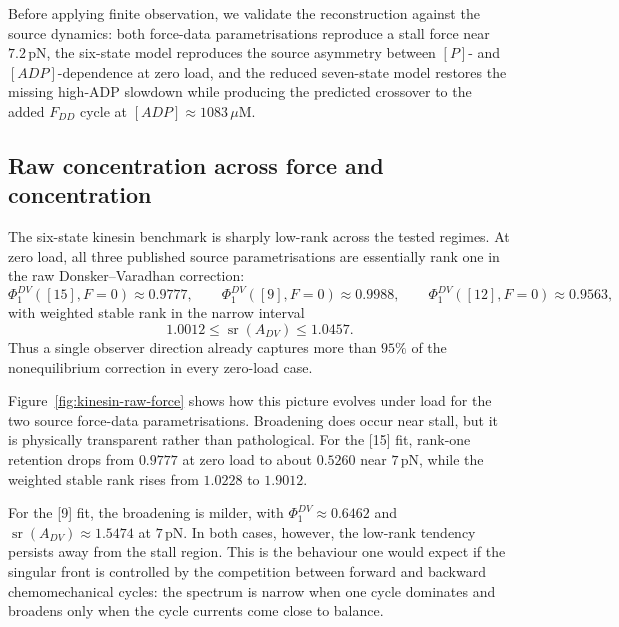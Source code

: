 \documentclass[11pt,a4paper]{article}
\numberwithin{equation}{section}
\theoremstyle{thmcompact}
\theoremstyle{remark}
\begin{document}
Before applying finite observation, we validate the reconstruction against the source dynamics: both force-data parametrisations reproduce a stall force near \(7.2\,\mathrm{pN}\), the six-state model reproduces the source asymmetry between \([P]\)- and \([ADP]\)-dependence at zero load, and the reduced seven-state model restores the missing high-ADP slowdown while producing the predicted crossover to the added \(F_{DD}\) cycle at \([ADP]\approx 1083\,\mu\mathrm{M}\).

\subsection{Raw concentration across force and concentration}

The six-state kinesin benchmark is sharply low-rank across the tested regimes. At zero load, all three published source parametrisations are essentially rank one in the raw Donsker--Varadhan correction:
\begin{equation}
\Phi^{DV}_{1}(\mathrm{[15]},F=0)\approx 0.9777,
\qquad
\Phi^{DV}_{1}(\mathrm{[9]},F=0)\approx 0.9988,
\qquad
\Phi^{DV}_{1}(\mathrm{[12]},F=0)\approx 0.9563,
\end{equation}
with weighted stable rank in the narrow interval
\begin{equation}
1.0012 \le \operatorname{sr}(A_{DV}) \le 1.0457.
\end{equation}
Thus a single observer direction already captures more than \(95\%\) of the nonequilibrium correction in every zero-load case.

Figure~\ref{fig:kinesin-raw-force} shows how this picture evolves under load for the two source force-data parametrisations. Broadening does occur near stall, but it is physically transparent rather than pathological. For the [15] fit, rank-one retention drops from \(0.9777\) at zero load to about \(0.5260\) near \(7\,\mathrm{pN}\), while the weighted stable rank rises from \(1.0228\) to \(1.9012\). 

For the [9] fit, the broadening is milder, with \(\Phi_1^{DV}\approx 0.6462\) and \(\operatorname{sr}(A_{DV})\approx 1.5474\) at \(7\,\mathrm{pN}\). In both cases, however, the low-rank tendency persists away from the stall region. This is the behaviour one would expect if the singular front is controlled by the competition between forward and backward chemomechanical cycles: the spectrum is narrow when one cycle dominates and broadens only when the cycle currents come close to balance.
\end{document}
